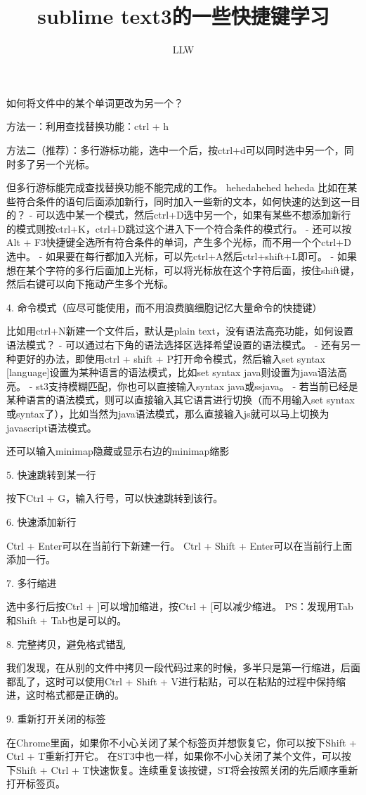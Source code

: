 \documentclass[a4paper,UTF8]{article}
\title{sublime text3的一些快捷键学习}
\author{LLW}
\date{}
\begin{document}
如何将文件中的某个单词更改为另一个？

方法一：利用查找替换功能：ctrl + h

方法二（推荐）：多行游标功能，选中一个后，按ctrl+d可以同时选中另一个，同时多了另一个光标。

但多行游标能完成查找替换功能不能完成的工作。
hehedahehed heheda 
比如在某些符合条件的语句后面添加新行，同时加入一些新的文本，如何快速的达到这一目的？
- 可以选中某一个模式，然后ctrl+D选中另一个，如果有某些不想添加新行的模式则按ctrl+K，ctrl+D跳过这个进入下一个符合条件的模式行。
- 还可以按Alt + F3快捷键全选所有符合条件的单词，产生多个光标，而不用一个个ctrl+D选中。
- 如果要在每行都加入光标，可以先ctrl+A然后ctrl+shift+L即可。
- 如果想在某个字符的多行后面加上光标，可以将光标放在这个字符后面，按住shift键，然后右键可以向下拖动产生多个光标。

4. 命令模式（应尽可能使用，而不用浪费脑细胞记忆大量命令的快捷键）

比如用ctrl+N新建一个文件后，默认是plain text，没有语法高亮功能，如何设置语法模式？
- 可以通过右下角的语法选择区选择希望设置的语法模式。
- 还有另一种更好的办法，即使用ctrl + shift + P打开命令模式，然后输入set syntax [language]设置为某种语言的语法模式，比如set syntax java则设置为java语法高亮。
- st3支持模糊匹配，你也可以直接输入syntax java或ssjava。
- 若当前已经是某种语言的语法模式，则可以直接输入其它语言进行切换（而不用输入set syntax或syntax了），比如当然为java语法模式，那么直接输入js就可以马上切换为javascript语法模式。

还可以输入minimap隐藏或显示右边的minimap缩影

5. 快速跳转到某一行

按下Ctrl + G，输入行号，可以快速跳转到该行。

6. 快速添加新行

    Ctrl + Enter可以在当前行下新建一行。
    Ctrl + Shift + Enter可以在当前行上面添加一行。

7. 多行缩进

选中多行后按Ctrl + ]可以增加缩进，按Ctrl + [可以减少缩进。
PS：发现用Tab和Shift + Tab也是可以的。

8. 完整拷贝，避免格式错乱

我们发现，在从别的文件中拷贝一段代码过来的时候，多半只是第一行缩进，后面都乱了，这时可以使用Ctrl + Shift + V进行粘贴，可以在粘贴的过程中保持缩进，这时格式都是正确的。

9. 重新打开关闭的标签

在Chrome里面，如果你不小心关闭了某个标签页并想恢复它，你可以按下Shift + Ctrl + T重新打开它。
在ST3中也一样，如果你不小心关闭了某个文件，可以按下Shift + Ctrl + T快速恢复。连续重复该按键，ST将会按照关闭的先后顺序重新打开标签页。
\end{document}
